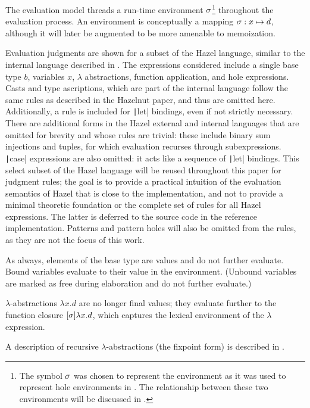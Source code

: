 The evaluation model threads a run-time environment $\sigma$\footnote{The symbol $\sigma$ was chosen to represent the environment as it was used to represent hole environments in \cite{conf/popl/HazelnutLive19}. The relationship between these two environments will be discussed in .} throughout the evaluation process. An environment is conceptually a mapping $\sigma:x\mapsto d$, although it will later be augmented to be more amenable to memoization.

Evaluation judgments are shown for a subset of the Hazel language, similar to the internal language described in \cite{conf/popl/HazelnutLive19}. The expressions considered include a single base type $b$, variables $x$, $\lambda$ abstractions, function application, and hole expressions. Casts and type ascriptions, which are part of the internal language follow the same rules as described in the Hazelnut paper, and thus are omitted here. Additionally, a rule is included for \texttt|let| bindings, even if not strictly necessary. There are additional forms in the Hazel external and internal languages that are omitted for brevity and whose rules are trivial: these include binary sum injections and tuples, for which evaluation recurses through subexpressions. \texttt|case| expressions are also omitted: it acts like a sequence of \texttt|let| bindings. This select subset of the Hazel language will be reused throughout this paper for judgment rules; the goal is to provide a practical intuition of the evaluation semantics of Hazel that is close to the implementation, and not to provide a minimal theoretic foundation or the complete set of rules for all Hazel expressions. The latter is deferred to the source code in the reference implementation. Patterns and pattern holes will also be omitted from the rules, as they are not the focus of this work.

As always, elements of the base type are values and do not further evaluate. Bound variables evaluate to their value in the environment. (Unbound variables are marked as free during elaboration and do not further evaluate.)

$\lambda$-abstractions $\lambda x.d$ are no longer final values; they evaluate further to the function closure $[\sigma]\lambda x.d$, which captures the lexical environment of the $\lambda$ expression.

A description of recursive $\lambda$-abstractions (the fixpoint form) is described in .

